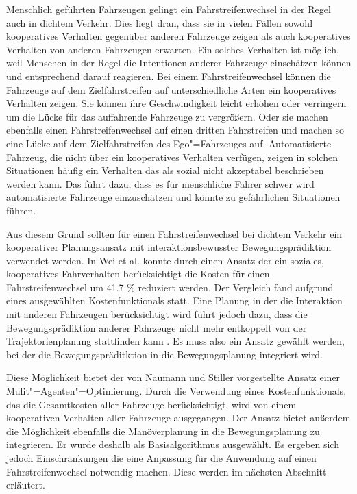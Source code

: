 Menschlich gef\"uhrten Fahrzeugen gelingt ein Fahrstreifenwechsel in der Regel auch in dichtem Verkehr.
Dies liegt dran, dass sie in vielen F\"allen sowohl kooperatives Verhalten gegen\"uber anderen Fahrzeuge zeigen als auch kooperatives Verhalten von anderen Fahrzeugen erwarten.
Ein solches Verhalten ist m\"oglich, weil Menschen in der Regel die Intentionen anderer Fahrzeuge einsch\"atzen k\"onnen und entsprechend darauf reagieren.
Bei einem Fahrstreifenwechsel k\"onnen die Fahrzeuge auf dem Zielfahrstreifen auf unterschiedliche Arten ein kooperatives Verhalten zeigen.
Sie k\"onnen ihre Geschwindigkeit leicht erh\"ohen oder verringern um die L\"ucke f\"ur das auffahrende Fahrzeuge zu vergr\"o{\ss}ern.
Oder sie machen ebenfalls einen Fahrstreifenwechsel auf einen dritten Fahrstreifen und machen so eine L\"ucke auf dem Zielfahrstreifen des Ego"=Fahrzeuges auf.
Automatisierte Fahrzeug, die nicht \"uber ein kooperatives Verhalten verf\"ugen, zeigen in solchen Situationen h\"aufig ein Verhalten das als sozial nicht akzeptabel beschrieben werden kann.
Das f\"uhrt dazu, dass es f\"ur menschliche Fahrer schwer wird automatisierte Fahrzeuge einzusch\"atzen und k\"onnte zu gef\"ahrlichen Situationen f\"uhren. \cite{Wei2013}

Aus diesem Grund sollten f\"ur einen Fahrstreifenwechsel bei dichtem Verkehr ein kooperativer Planungsansatz mit interaktionsbewusster Bewegungspr\"adiktion verwendet werden.
In Wei et al. \cite{Wei2013} konnte durch einen Ansatz der ein soziales, kooperatives Fahrverhalten ber\"ucksichtigt die Kosten f\"ur einen Fahrstreifenwechsel um 41.7 \% reduziert werden.
Der Vergleich fand aufgrund eines ausgew\"ahlten Kostenfunktionals statt.
Eine Planung in der die Interaktion mit anderen Fahrzeugen ber\"ucksichtigt wird f\"uhrt jedoch dazu, dass die Bewegungspr\"adiktion anderer Fahrzeuge nicht mehr entkoppelt von der Trajektorienplanung stattfinden kann \cite{Hubmann2018}.
Es muss also ein Ansatz gew\"ahlt werden, bei der die Bewegungspr\"aditktion in die Bewegungsplanung integriert wird.

Diese M\"oglichkeit bietet der von Naumann und Stiller \cite{Naumann2017towards} vorgestellte Ansatz einer Mulit"=Agenten"=Optimierung.
Durch die Verwendung eines Kostenfunktionals, das die Gesamtkosten aller Fahrzeuge ber\"ucksichtigt, wird von einem kooperativen Verhalten aller Fahrzeuge ausgegangen.
Der Ansatz bietet au{\ss}erdem die M\"oglichkeit ebenfalls die Man\"overplanung in die Bewegungsplanung zu integrieren.
Er wurde deshalb als Basisalgorithmus ausgew\"ahlt.
Es ergeben sich jedoch Einschr\"ankungen die eine Anpassung f\"ur die Anwendung auf einen Fahrstreifenwechsel notwendig machen.
Diese werden im n\"achsten Abschnitt erl\"autert.



